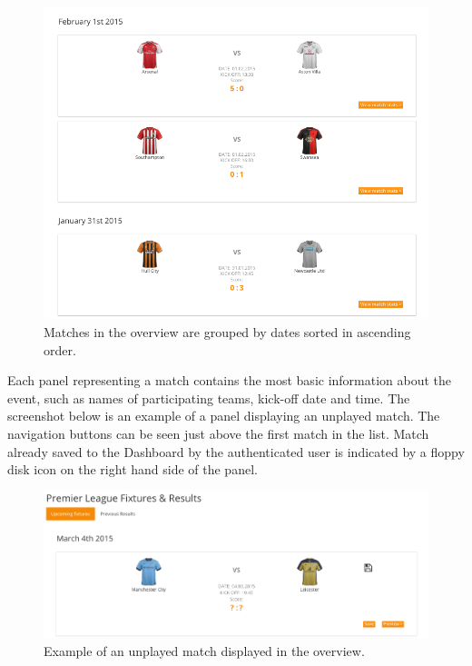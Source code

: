 \begin{figure}[H]
	\begin{center}
		\includegraphics[width=.90\textwidth]{impl/images/matchesGrouped}
		\caption{Matches in the overview are grouped by dates sorted in ascending order.} \label{fig:using:matchesgrouped}
	\end{center}
\end{figure}
 
Each panel representing a match contains the most basic information about the event, such as names of participating teams, kick-off date and time. The screenshot below is an example of a panel displaying an unplayed match. The navigation buttons can be seen just above the first match in the list. Match already saved to the Dashboard by the authenticated user is indicated by a floppy disk icon on the right hand side of the panel.

\begin{figure}[H]
	\begin{center}
		\includegraphics[width=.90\textwidth]{impl/images/unplayedMatch}
		\caption{Example of an unplayed match displayed in the overview.} \label{fig:using:unplayedmatch}
	\end{center}
\end{figure}

